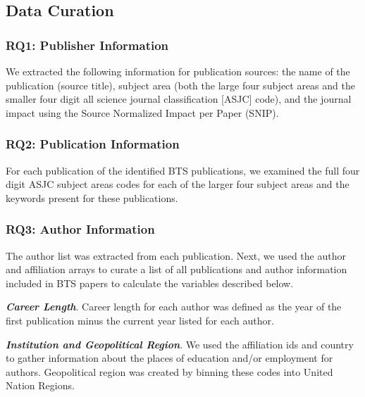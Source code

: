 \documentclass[
  man,floatsintext]{apa6}
\begin{document}
\hypertarget{data-curation}{%
\subsection{Data Curation}\label{data-curation}}

\hypertarget{rq1-publisher-information}{%
\subsubsection{RQ1: Publisher Information}\label{rq1-publisher-information}}

We extracted the following information for publication sources: the name
of the publication (source title), subject area (both the large four
subject areas and the smaller four digit all science journal
classification {[}ASJC{]} code), and the journal impact using the Source
Normalized Impact per Paper (SNIP).

\hypertarget{rq2-publication-information}{%
\subsubsection{RQ2: Publication Information}\label{rq2-publication-information}}

For each publication of the identified BTS publications, we examined the
full four digit ASJC subject areas codes for each of the larger four
subject areas and the keywords present for these publications.

\hypertarget{rq3-author-information}{%
\subsubsection{RQ3: Author Information}\label{rq3-author-information}}

The author list was extracted from each publication. Next, we used the
author and affiliation arrays to curate a list of all publications and
author information included in BTS papers to calculate the variables
described below.

\textbf{\emph{Career Length}}. Career length for each author was defined as the
year of the first publication minus the current year listed for each
author.

\textbf{\emph{Institution and Geopolitical Region}}. We used the affiliation ids
and country to gather information about the places of education and/or
employment for authors. Geopolitical region was created by binning these
codes into United Nation Regions.
\end{document}
